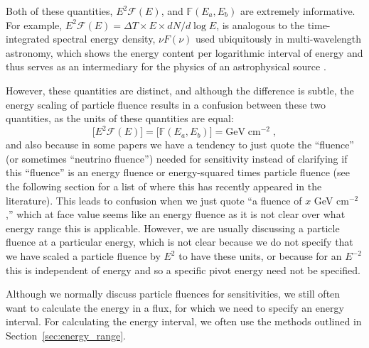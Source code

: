 \documentclass[a4paper,11pt]{article}
\begin{document}
Both of these quantities, $E^2\mathcal{F}(E)$, and $\mathbb{F}(E_a, E_b)$ are extremely informative. For example, $E^2\mathcal{F}(E) = \Delta T \times E \times dN / d\log E$, is analogous to the time-integrated spectral energy density, $\nu F(\nu)$ used ubiquitously in multi-wavelength astronomy, which shows the energy content per logarithmic interval of energy and thus serves as an intermediary for the physics of an astrophysical source \cite{Gaisser:2016uoy}.

However, these quantities are distinct, and although the difference is subtle, the energy scaling of particle fluence results in a confusion between these two quantities, as the units of these quantities are equal:
\begin{equation}
    \big[E^2\mathcal{F}(E)\big] = \big[\mathbb{F}(E_a, E_b)\big] = \mathrm{GeV}\;\mathrm{cm}^{-2}\;,
\end{equation}
and also because in some papers we have a tendency to just quote the ``fluence'' (or sometimes ``neutrino fluence'') needed for sensitivity instead of clarifying if this ``fluence'' is an energy fluence or energy-squared times particle fluence (see the following section for a list of where this has recently appeared in the literature). This leads to confusion when we just quote ``a fluence of $x$ GeV cm$^{-2}$,'' which at face value seems like an energy fluence as it is not clear over what energy range this is applicable. However, we are usually discussing a particle fluence at a particular energy, which is not clear because we do not specify that we have scaled a particle fluence by $E^2$ to have these units, or because for an $E^{-2}$ this is independent of energy and so a specific pivot energy need not be specified.

Although we normally discuss particle fluences for sensitivities, we still often want to calculate the energy in a flux, for which we need to specify an energy interval. For calculating the energy interval, we often use the methods outlined in Section~\ref{sec:energy_range}.
\end{document}
